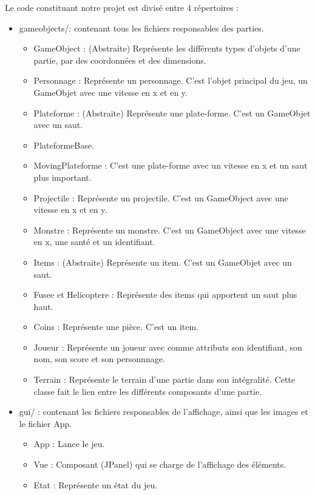 \documentclass{article}
\begin{document}
Le code constituant notre projet est divisé entre 4 répertoires :
\begin{itemize}
    \item gameobjects/: contenant tous les fichiers responsables des parties.
    \begin{itemize}
        \item GameObject : (Abstraite) Représente les différents types d'objets d'une partie, par des coordonnées et des dimensions.
        \item Personnage : Représente un personnage. C'est l'objet principal du jeu, un GameObjet avec une vitesse en x et en y.
        \item Plateforme : (Abstraite) Représente une plate-forme. C'est un GameObjet avec un saut.
        \item PlateformeBase.
        \item MovingPlateforme : C'est une plate-forme avec un vitesse en x et un saut plus important.
        \item Projectile : Représente un projectile. C'est un GameObject avec une vitesse en x et en y.
        \item Monstre : Représente un monstre. C'est un GameObject avec une vitesse en x, une santé et un identifiant.
        \item Items : (Abstraite) Représente un item. C'est un GameObjet avec un saut.
        \item Fusee et Helicoptere : Représente des items qui apportent un saut plus haut.
        \item Coins : Représente une pièce. C'est un item.
        \item Joueur : Représente un joueur avec comme attributs son identifiant, son nom, son score et son personnnage.
        \item Terrain : Représente le terrain d'une partie dans son intégralité. Cette classe fait le lien entre les différents composants d'une partie.
    \end{itemize}    
    \item gui/ : contenant les fichiers responsables de l'affichage, ainsi que les images et le fichier App.
    \begin{itemize}
        \item App : Lance le jeu.
        \item Vue : Composant (JPanel) qui se charge de l'affichage des éléments.
        \item Etat : Représente un état du jeu.
        \begin{itemize}

\end{itemize}
\end{itemize}
\end{itemize}
\end{document}
